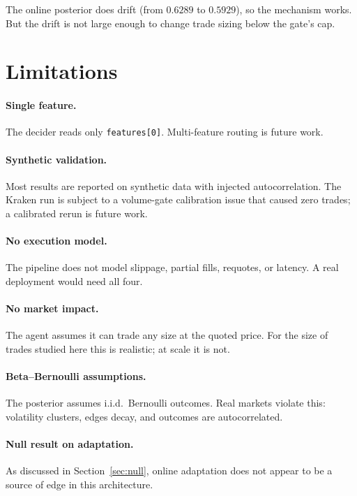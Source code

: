 \documentclass[11pt,a4paper]{article}
\theoremstyle{definition}
\begin{document}
The online posterior does drift (from $0.6289$ to $0.5929$), so the mechanism works. But the drift is not large enough to change trade sizing below the gate's cap.

\section{Limitations}
\label{sec:limits}

\paragraph{Single feature.}
The decider reads only \texttt{features[0]}. Multi-feature routing is future work.

\paragraph{Synthetic validation.}
Most results are reported on synthetic data with injected autocorrelation. The Kraken run is subject to a volume-gate calibration issue that caused zero trades; a calibrated rerun is future work.

\paragraph{No execution model.}
The pipeline does not model slippage, partial fills, requotes, or latency. A real deployment would need all four.

\paragraph{No market impact.}
The agent assumes it can trade any size at the quoted price. For the size of trades studied here this is realistic; at scale it is not.

\paragraph{Beta--Bernoulli assumptions.}
The posterior assumes i.i.d.\ Bernoulli outcomes. Real markets violate this: volatility clusters, edges decay, and outcomes are autocorrelated.

\paragraph{Null result on adaptation.}
As discussed in Section~\ref{sec:null}, online adaptation does not appear to be a source of edge in this architecture.
\end{document}
